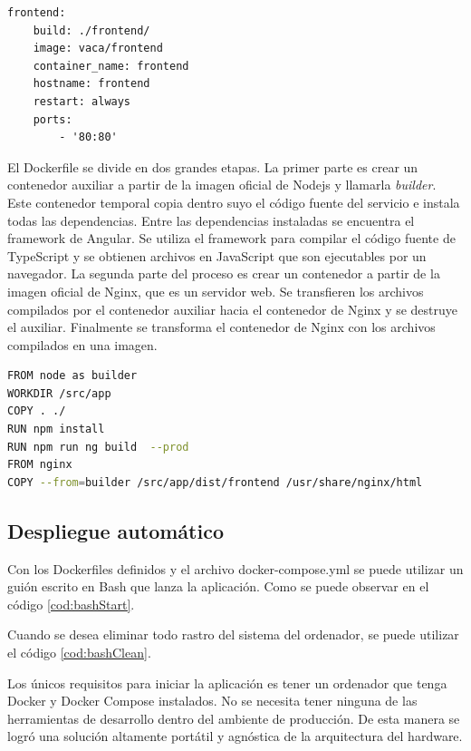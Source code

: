 \begin{lstlisting}[label=cod:dcFrontend,caption=Orquestación del servicio Frontend.]
frontend:
	build: ./frontend/
	image: vaca/frontend
	container_name: frontend
	hostname: frontend
	restart: always
	ports: 
		- '80:80'
\end{lstlisting}

El Dockerfile se divide en dos grandes etapas.
La primer parte es crear un contenedor auxiliar a partir de la imagen oficial de Nodejs y llamarla \emph{builder}.
Este contenedor temporal copia dentro suyo el código fuente del servicio e instala todas las dependencias.
Entre las dependencias instaladas se encuentra el framework de Angular.
Se utiliza el framework para compilar el código fuente de TypeScript y se obtienen archivos en JavaScript que son ejecutables por un navegador.
La segunda parte del proceso es crear un contenedor a partir de la imagen oficial de Nginx, que es un servidor web.
Se transfieren los archivos compilados por el contenedor auxiliar hacia el contenedor de Nginx y se destruye el auxiliar.
Finalmente se transforma el contenedor de Nginx con los archivos compilados en una imagen.

\begin{lstlisting}[language=bash,label=cod:dfFrontend,caption=Dockerfile del servicio Frontend.]
FROM node as builder
WORKDIR /src/app
COPY . ./
RUN npm install
RUN npm run ng build  --prod
FROM nginx
COPY --from=builder /src/app/dist/frontend /usr/share/nginx/html
\end{lstlisting}

\subsection{Despliegue automático}

Con los Dockerfiles definidos y el archivo docker-compose.yml se puede utilizar un guión escrito en Bash que lanza la aplicación.
Como se puede observar en el código \ref{cod:bashStart}.

Cuando se desea eliminar todo rastro del sistema del ordenador, se puede utilizar el código \ref{cod:bashClean}.

Los únicos requisitos para iniciar la aplicación es tener un ordenador que tenga Docker y Docker Compose instalados.
No se necesita tener ninguna de las herramientas de desarrollo dentro del ambiente de producción.
De esta manera se logró una solución altamente portátil y agnóstica de la arquitectura del hardware.

\newpage


